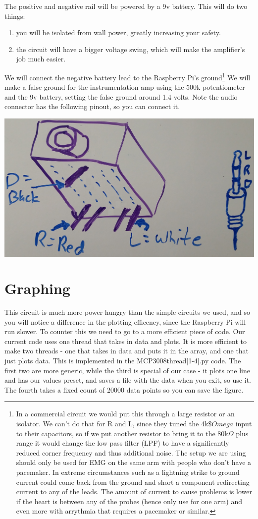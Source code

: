 The positive and negative rail will be powered by a 9v battery. This will do two things:
\begin{enumerate}
\item you will be isolated from wall power, greatly increasing your safety.
\item the circuit will have a bigger voltage swing, which will make the amplifier's job much easier.
\end{enumerate}
We will connect the negative battery lead to the Raspberry Pi's ground\footnote{In a commercial circuit we would put this through a large resistor or an isolator.  We can't do that for R and L, since they tuned the 4k$\$Omega$ input to their capacitors, so if we put another resistor to bring it to the 80k$\Omega$ plus range it would change the low pass filter (LPF) to have a significantly reduced corner frequency and thus additional noise.  The setup we are using should only be used for EMG on the same arm with people who don't have a pacemaker. In extreme circumstances such as a lightning strike to ground current could come back from the ground and short a component redirecting current to any of the leads.  The amount of current to cause problems is lower if the heart is between any of the probes (hence only use for one arm) and even more with arrythmia that requires a pacemaker or similar.} We will make a false ground for the instrumentation amp using the 500k potentiometer and the 9v battery, setting the false ground around 1.4 volts.  Note the audio connector has the following pinout, so you can connect it.


\includegraphics[width=.3\textwidth]{../images/audio_jack.jpg}

\section{Graphing}

This circuit is much more power hungry than the simple circuits we used, and so you will notice a difference in the plotting efficency, since the Raspberry Pi will run slower.  To counter this we need to go to a more efficient piece of code.  Our current code uses one thread that takes in data and plots.  It is more efficient to make two threads - one that takes in data and puts it in the array, and one that just plots data.  This is implemented in the MCP3008thread[1-4].py code.  The first two are more generic, while the third is special of our case - it plots one line and has our values preset, and saves a file with the data when you exit, so use it.  The fourth takes a fixed count of 20000 data points so you can save the figure.

